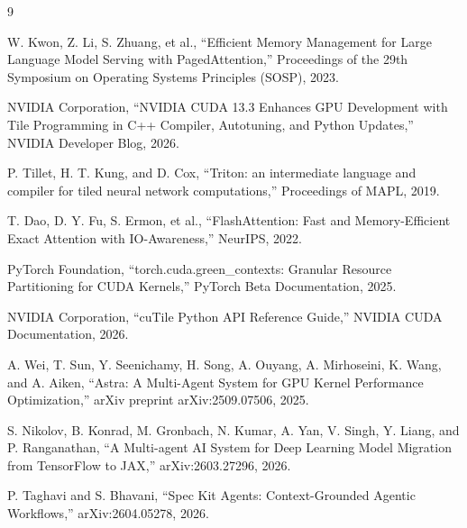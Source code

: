 \documentclass{kcc}            %
\begin{document}
\begin{thebibliography}{9}

W. Kwon, Z. Li, S. Zhuang, et al., ``Efficient Memory Management for
Large Language Model Serving with PagedAttention,'' Proceedings of the 29th
Symposium on Operating Systems Principles (SOSP), 2023.

NVIDIA Corporation, ``NVIDIA CUDA 13.3 Enhances GPU Development with Tile
Programming in C++ Compiler, Autotuning, and Python Updates,'' NVIDIA
Developer Blog, 2026.

P. Tillet, H. T. Kung, and D. Cox, ``Triton: an intermediate language and
compiler for tiled neural network computations,'' Proceedings of MAPL, 2019.

T. Dao, D. Y. Fu, S. Ermon, et al., ``FlashAttention: Fast and
Memory-Efficient Exact Attention with IO-Awareness,'' NeurIPS, 2022.

PyTorch Foundation, ``torch.cuda.green\_contexts: Granular Resource
Partitioning for CUDA Kernels,'' PyTorch Beta Documentation, 2025.

NVIDIA Corporation, ``cuTile Python API Reference Guide,'' NVIDIA CUDA
Documentation, 2026.

A. Wei, T. Sun, Y. Seenichamy, H. Song, A. Ouyang, A. Mirhoseini, K. Wang,
and A. Aiken, ``Astra: A Multi-Agent System for GPU Kernel Performance
Optimization,'' arXiv preprint arXiv:2509.07506, 2025.

S. Nikolov, B. Konrad, M. Gronbach, N. Kumar, A. Yan, V. Singh, Y. Liang,
and P. Ranganathan, ``A Multi-agent AI System for Deep Learning Model
Migration from TensorFlow to JAX,'' arXiv:2603.27296, 2026.

P. Taghavi and S. Bhavani, ``Spec Kit Agents: Context-Grounded Agentic
Workflows,'' arXiv:2604.05278, 2026.

\end{thebibliography}
\end{document}

